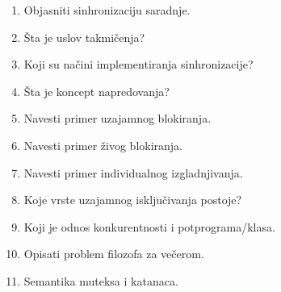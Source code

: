 \documentclass[main.tex]{subfiles}
\begin{document}
\begin{multicols}{2}
\begin{enumerate}
\item Objasniti sinhronizaciju saradnje.
\item Šta je uslov takmičenja?
\item Koji su načini implementiranja sinhronizacije?
\item Šta je koncept napredovanja?
\item Navesti primer uzajamnog blokiranja.
\item Navesti primer živog blokiranja.
\item Navesti primer individualnog izgladnjivanja.
\item Koje vrste uzajamnog isključivanja postoje?
\item Koji je odnos konkurentnosti i potprograma/klasa.
\item Opisati problem filozofa za večerom.
\item Semantika muteksa i katanaca.
\end{enumerate}


\end{multicols}
\end{document}

